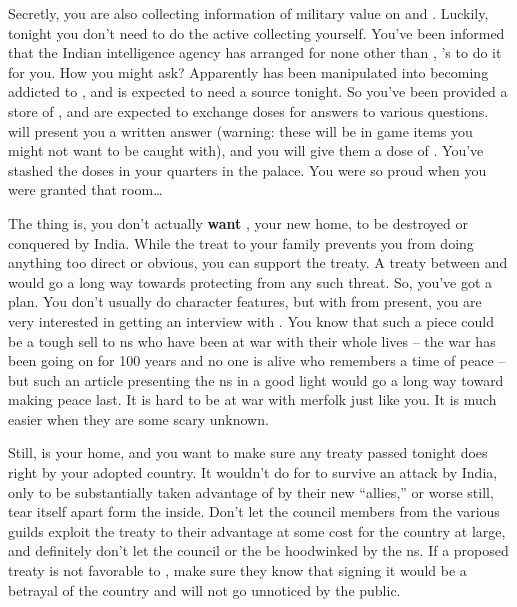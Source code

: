 \documentclass[char]{NeptuneBall}
\begin{document}
Secretly, you are also collecting information of military value on \pAtlantis{} and \pPacifica{}. Luckily, tonight you don't need to do the active collecting yourself. You've been informed that the Indian intelligence agency has arranged for none other than \cWillow{}, \cAriel{}'s \cWillow{\offspring} to do it for you. How you might ask? Apparently \cWillow{} has been manipulated into becoming addicted to \iDrug{\MYname}, and is expected to need a source tonight. So you've been provided a store of \iDrug{}, and are expected to exchange doses for answers to various questions. \cWillow{} will present you a written answer (warning: these will be in game items you might not want to be caught with), and you will give them a dose of \iDrug{}. You've stashed the doses in your quarters in the palace. You were so proud when you were granted that room\ldots{}

The thing is, you don't actually \textbf{want} \pAtlantis{}, your new home, to be destroyed or conquered by India. While the treat to your family prevents you from doing anything too direct or obvious, you can support the treaty. A treaty between \pAtlantis{} and \pPacifica{} would go a long way towards protecting \pAtlantis{} from any such threat. So, you've got a plan. You don't usually do character features, but with \cPrince{\aprince} from \pPacifica{} present, you are very interested in getting an interview with \cPrince{\them}. You know that such a piece could be a tough sell to \pAtlantis{}ns who have been at war with \pPacifica{} their whole lives -- the war has been going on for 100 years and no one is alive who remembers a time of peace -- but such an article presenting the \pPacifica{}ns in a good light would go a long way toward making peace last. It is hard to be at war with merfolk just like you. It is much easier when they are some scary unknown.

Still, \pAtlantis{} is your home, and you want to make sure any treaty passed tonight does right by your adopted country. It wouldn't do for \pAtlantis{} to survive an attack by India, only to be substantially taken advantage of by their new ``allies,'' or worse still, tear itself apart form the inside. Don't let the council members from the various guilds exploit the treaty to their advantage at some cost for the country at large, and definitely don't let the council or the \cKing{\King} be hoodwinked by the \pPacifica{}ns. If a proposed treaty is not favorable to \pAtlantis{}, make sure they know that signing it would be a betrayal of the country and will not go unnoticed by the public. 
\end{document}
